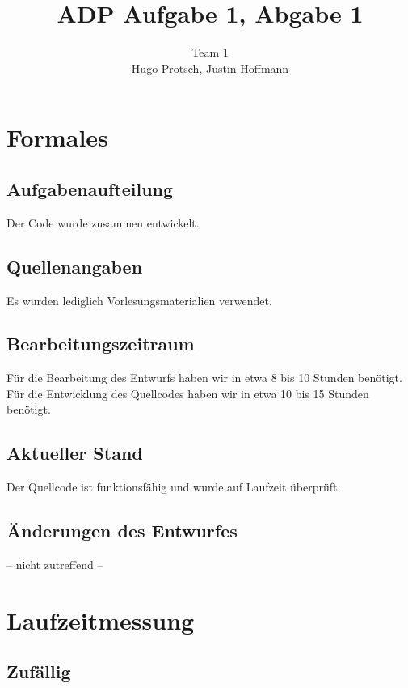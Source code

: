 \documentclass[11pt]{article}
\title{ADP Aufgabe 1, Abgabe 1}
\author{Team 1\\Hugo Protsch, Justin Hoffmann}
\begin{document}
    \maketitle


    \section{Formales}\label{sec:Formales}


    \subsection{Aufgabenaufteilung}
    Der Code wurde zusammen entwickelt.

    \subsection{Quellenangaben}
    
    Es wurden lediglich Vorlesungsmaterialien verwendet.


    \subsection{Bearbeitungszeitraum}
    Für die Bearbeitung des Entwurfs haben wir in etwa 8 bis 10 Stunden
    benötigt.
    Für die Entwicklung des Quellcodes haben wir in etwa 10 bis 15 Stunden
    benötigt.

    \subsection{Aktueller Stand}
    Der Quellcode ist funktionsfähig und wurde auf Laufzeit überprüft.


    \subsection{Änderungen des Entwurfes}
    -- nicht zutreffend --


    \section{Laufzeitmessung}\label{sec:laufzeitmessung}
    \subsection{Zufällig}\label{subsec:zufaellig}
\end{document}
